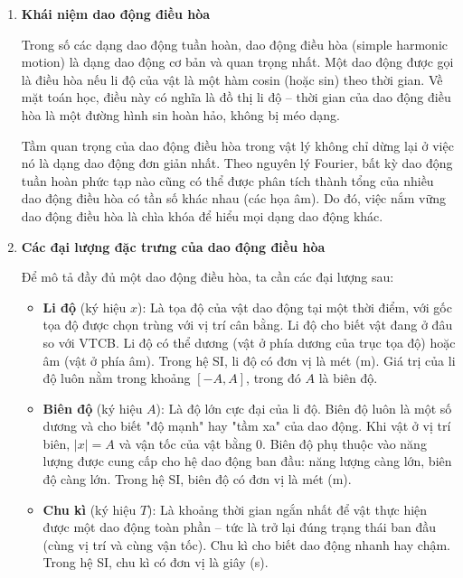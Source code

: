 \begin{enumerate}[label=\alph*)]
    \item \textbf{Khái niệm dao động điều hòa}

    Trong số các dạng dao động tuần hoàn, dao động điều hòa (simple harmonic motion) là dạng dao động cơ bản và quan trọng nhất. Một dao động được gọi là điều hòa nếu li độ của vật là một hàm cosin (hoặc sin) theo thời gian. Về mặt toán học, điều này có nghĩa là đồ thị li độ – thời gian của dao động điều hòa là một đường hình sin hoàn hảo, không bị méo dạng.

    \begin{center}
    \end{center}

    Tầm quan trọng của dao động điều hòa trong vật lý không chỉ dừng lại ở việc nó là dạng dao động đơn giản nhất. Theo nguyên lý Fourier, bất kỳ dao động tuần hoàn phức tạp nào cũng có thể được phân tích thành tổng của nhiều dao động điều hòa có tần số khác nhau (các họa âm). Do đó, việc nắm vững dao động điều hòa là chìa khóa để hiểu mọi dạng dao động khác.

    \item \textbf{Các đại lượng đặc trưng của dao động điều hòa}

    Để mô tả đầy đủ một dao động điều hòa, ta cần các đại lượng sau:

    \begin{itemize}
        \item \textbf{Li độ} (ký hiệu $x$): Là tọa độ của vật dao động tại một thời điểm, với gốc tọa độ được chọn trùng với vị trí cân bằng. Li độ cho biết vật đang ở đâu so với VTCB. Li độ có thể dương (vật ở phía dương của trục tọa độ) hoặc âm (vật ở phía âm). Trong hệ SI, li độ có đơn vị là mét (m). Giá trị của li độ luôn nằm trong khoảng $[-A, A]$, trong đó $A$ là biên độ.
        
        \item \textbf{Biên độ} (ký hiệu $A$): Là độ lớn cực đại của li độ. Biên độ luôn là một số dương và cho biết "độ mạnh" hay "tầm xa" của dao động. Khi vật ở vị trí biên, $|x| = A$ và vận tốc của vật bằng 0. Biên độ phụ thuộc vào năng lượng được cung cấp cho hệ dao động ban đầu: năng lượng càng lớn, biên độ càng lớn. Trong hệ SI, biên độ có đơn vị là mét (m).
        
        \item \textbf{Chu kì} (ký hiệu $T$): Là khoảng thời gian ngắn nhất để vật thực hiện được một dao động toàn phần – tức là trở lại đúng trạng thái ban đầu (cùng vị trí và cùng vận tốc). Chu kì cho biết dao động nhanh hay chậm. Trong hệ SI, chu kì có đơn vị là giây (s).
        

\end{itemize}
\end{enumerate}
